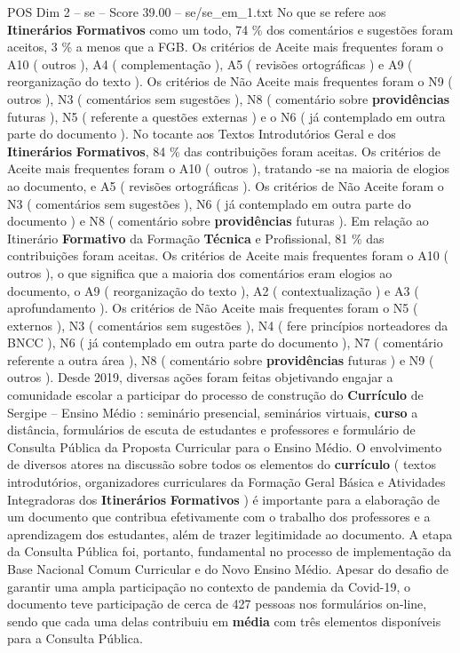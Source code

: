 \begin{textsample}{POS Dim 2 – se – Score 39.00 – se/se\_em\_1.txt}
No que se refere aos \textbf{Itinerários} \textbf{Formativos} como um todo, 74 \% dos comentários e sugestões foram aceitos, 3 \% a menos que a FGB.
Os critérios de Aceite mais frequentes foram o A10 ( outros ), A4 ( complementação ), A5 ( revisões ortográficas ) e A9 ( reorganização do texto ).
Os critérios de Não Aceite mais frequentes foram o N9 ( outros ), N3 ( comentários sem sugestões ), N8 ( comentário sobre \textbf{providências} futuras ), N5 ( referente a questões externas ) e o N6 ( já contemplado em outra parte do documento ).
No tocante aos Textos Introdutórios Geral e dos \textbf{Itinerários} \textbf{Formativos}, 84 \% das contribuições foram aceitas.
Os critérios de Aceite mais frequentes foram o A10 ( outros ), tratando -se na maioria de elogios ao documento, e A5 ( revisões ortográficas ).
Os critérios de Não Aceite foram o N3 ( comentários sem sugestões ), N6 ( já contemplado em outra parte do documento ) e N8 ( comentário sobre \textbf{providências} futuras ).
Em relação ao Itinerário \textbf{Formativo} da Formação \textbf{Técnica} e Profissional, 81 \% das contribuições foram aceitas.
Os critérios de Aceite mais frequentes foram o A10 ( outros ), o que significa que a maioria dos comentários eram elogios ao documento, o A9 ( reorganização do texto ), A2 ( contextualização ) e A3 ( aprofundamento ).
Os critérios de Não Aceite mais frequentes foram o N5 ( externos ), N3 ( comentários sem sugestões ), N4 ( fere princípios norteadores da BNCC ), N6 ( já contemplado em outra parte do documento ), N7 ( comentário referente a outra área ), N8 ( comentário sobre \textbf{providências} futuras ) e N9 ( outros ).
Desde 2019, diversas ações foram feitas objetivando engajar a comunidade escolar a participar do processo de construção do \textbf{Currículo} de Sergipe – Ensino Médio : seminário presencial, seminários virtuais, \textbf{curso} a distância, formulários de escuta de estudantes e professores e formulário de Consulta Pública da Proposta Curricular para o Ensino Médio.
O envolvimento de diversos atores na discussão sobre todos os elementos do \textbf{currículo} ( textos introdutórios, organizadores curriculares da Formação Geral Básica e Atividades Integradoras dos \textbf{Itinerários} \textbf{Formativos} ) é importante para a elaboração de um documento que contribua efetivamente com o trabalho dos professores e a aprendizagem dos estudantes, além de trazer legitimidade ao documento.
A etapa da Consulta Pública foi, portanto, fundamental no processo de implementação da Base Nacional Comum Curricular e do Novo Ensino Médio.
Apesar do desafio de garantir uma ampla participação no contexto de pandemia da Covid-19, o documento teve participação de cerca de 427 pessoas nos formulários on-line, sendo que cada uma delas contribuiu em \textbf{média} com três elementos disponíveis para a Consulta Pública.

\end{textsample}
